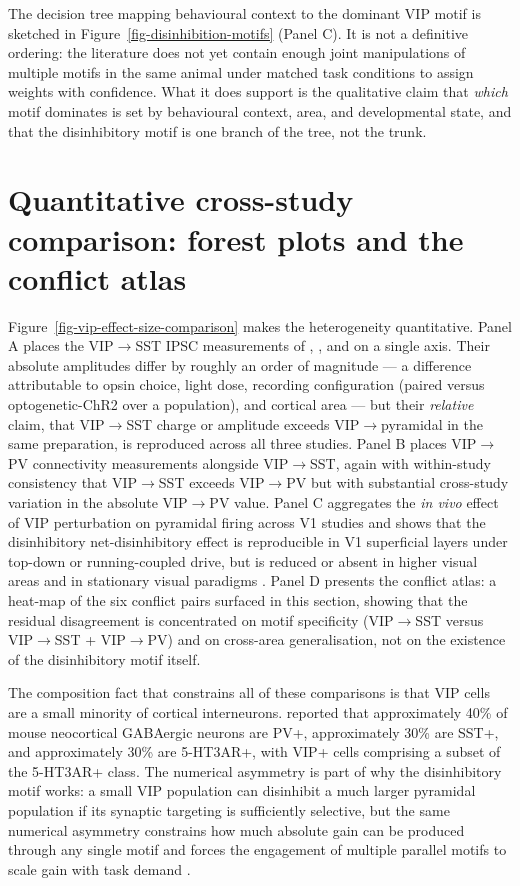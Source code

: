\documentclass[11pt]{article}
\let\origrightarrow\rightarrow
\def\rightarrow{\ensuremath{\origrightarrow}}
\begin{document}
The decision tree mapping behavioural context to the dominant VIP motif is sketched in Figure~\ref{fig-disinhibition-motifs} (Panel C). It is not a definitive ordering: the literature does not yet contain enough joint manipulations of multiple motifs in the same animal under matched task conditions to assign weights with confidence. What it does support is the qualitative claim that \textit{which} motif dominates is set by behavioural context, area, and developmental state, and that the disinhibitory motif is one branch of the tree, not the trunk.

\section{Quantitative cross-study comparison: forest plots and the conflict atlas}

Figure~\ref{fig-vip-effect-size-comparison} makes the heterogeneity quantitative. Panel A places the VIP\rightarrow SST IPSC measurements of \citet{Pfeffer2013}, \citet{Lee2013}, and \citet{Pi2013} on a single axis. Their absolute amplitudes differ by roughly an order of magnitude --- a difference attributable to opsin choice, light dose, recording configuration (paired versus optogenetic-ChR2 over a population), and cortical area --- but their \textit{relative} claim, that VIP\rightarrow SST charge or amplitude exceeds VIP\rightarrow pyramidal in the same preparation, is reproduced across all three studies. Panel B places VIP\rightarrow PV connectivity measurements alongside VIP\rightarrow SST, again with within-study consistency that VIP\rightarrow SST exceeds VIP\rightarrow PV but with substantial cross-study variation in the absolute VIP\rightarrow PV value. Panel C aggregates the \textit{in vivo} effect of VIP perturbation on pyramidal firing across V1 studies and shows that the disinhibitory net-disinhibitory effect is reproducible in V1 superficial layers under top-down or running-coupled drive, but is reduced or absent in higher visual areas and in stationary visual paradigms \citep{Pakan2016, Garrett2020, Dipoppa2018}. Panel D presents the conflict atlas: a heat-map of the six conflict pairs surfaced in this section, showing that the residual disagreement is concentrated on motif specificity (VIP\rightarrow SST versus VIP\rightarrow SST + VIP\rightarrow PV) and on cross-area generalisation, not on the existence of the disinhibitory motif itself.

The composition fact that constrains all of these comparisons is that VIP cells are a small minority of cortical interneurons. \citet{Rudy2011} reported that approximately 40\% of mouse neocortical GABAergic neurons are PV+, approximately 30\% are SST+, and approximately 30\% are 5-HT3AR+, with VIP+ cells comprising a subset of the 5-HT3AR+ class. The numerical asymmetry is part of why the disinhibitory motif works: a small VIP population can disinhibit a much larger pyramidal population if its synaptic targeting is sufficiently selective, but the same numerical asymmetry constrains how much absolute gain can be produced through any single motif and forces the engagement of multiple parallel motifs to scale gain with task demand \citep{Garciadelmolino2017, Litwinkumar2016}.
\end{document}
